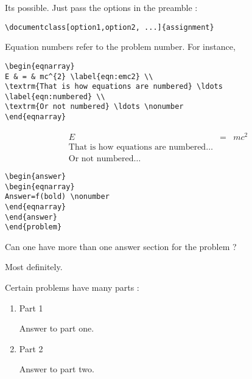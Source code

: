 \documentclass{assignment}
\begin{document}
\begin{problemlist}
Its possible. Just pass the options in the preamble :

\begin{verbatim}
\documentclass[option1,option2, ...]{assignment}
\end{verbatim}


Equation numbers refer to the problem number. For instance,

\begin{verbatim}
\begin{eqnarray}
E & = & mc^{2} \label{eqn:emc2} \\
\textrm{That is how equations are numbered} \ldots \label{eqn:numbered} \\
\textrm{Or not numbered} \ldots \nonumber
\end{eqnarray}
\end{verbatim}

\begin{eqnarray}
E & = & mc^{2} \label{eqn:emc2} \\
\textrm{That is how equations are numbered} \ldots \label{eqn:numbered} \\
\textrm{Or not numbered} \ldots \nonumber
\end{eqnarray}


\begin{verbatim}
\begin{answer}
\begin{eqnarray}
Answer=f(bold) \nonumber
\end{eqnarray}
\end{answer}
\end{problem}
\end{verbatim}


\pbitem Can one have more than one answer section for the problem ?

\begin{problem}

Most definitely.

Certain problems have many parts :

\begin{enumerate}
\item Part 1

\begin{answer}
Answer to part one.
\end{answer}

\item Part 2

\begin{answer}
Answer to part two.
\end{answer}


\end{enumerate}
\end{problem}
\end{problemlist}
\end{document}
